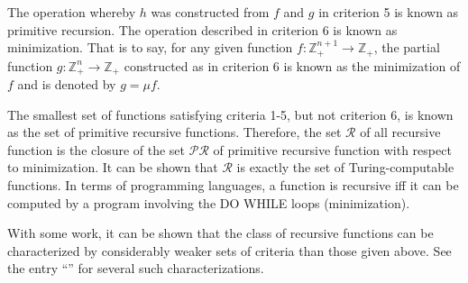 \documentclass[12pt]{article}
\begin{document}
The operation whereby $h$ was constructed from $f$ and $g$ in criterion 5 is known as primitive recursion.  The operation described in criterion 6 is known as minimization.  That is to say, for any given function $f\colon \mathbb{Z}_+^{n+1} \to \mathbb{Z}_+$, the partial function $g \colon \mathbb{Z}_+^n \to \mathbb{Z}_+$ constructed as in criterion 6 is known as the minimization of $f$ and is denoted by $g = \mu f$.

The smallest set of functions satisfying criteria 1-5, but not criterion 6, is known as the set of primitive recursive functions.  Therefore, the set $\mathcal{R}$ of all recursive function is the closure of the set $\mathcal{PR}$ of primitive recursive function with respect to minimization.  It can be shown that $\mathcal{R}$ is exactly the set of Turing-computable functions.  In terms of programming languages, a function is recursive iff it can be computed by a program involving the DO WHILE loops (minimization).

With some work, it can be shown that the class of recursive functions can be characterized by considerably weaker sets of criteria than those given above.  See the entry ``'' for several such characterizations.
\end{document}
